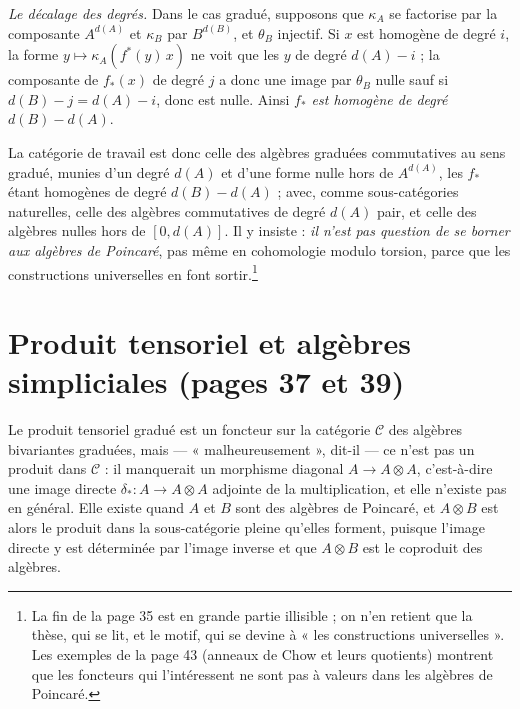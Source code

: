 \documentclass[11pt,a4paper]{article}
\begin{document}
\emph{Le décalage des degrés.} Dans le cas gradué, supposons que $\kappa_{A}$
se factorise par la composante $A^{d(A)}$ et $\kappa_{B}$ par $B^{d(B)}$, et
$\theta_{B}$ injectif. Si $x$ est homogène de degré $i$, la forme
$y \mapsto \kappa_{A}(f^{*}(y)\, x)$ ne voit que les $y$ de degré $d(A) - i$ ;
la composante de $f_{*}(x)$ de degré $j$ a donc une image par $\theta_{B}$
nulle sauf si $d(B) - j = d(A) - i$, donc est nulle. Ainsi
\emph{$f_{*}$ est homogène de degré $d(B) - d(A)$}.

La catégorie de travail est donc celle des algèbres graduées commutatives au
sens gradué, munies d'un degré $d(A)$ et d'une forme nulle hors de
$A^{d(A)}$, les $f_{*}$ étant homogènes de degré $d(B) - d(A)$ ; avec, comme
sous-catégories naturelles, celle des algèbres commutatives de degré $d(A)$
pair, et celle des algèbres nulles hors de $[0, d(A)]$. Il y insiste :
\emph{il n'est pas question de se borner aux algèbres de Poincaré}, pas même en
cohomologie modulo torsion, parce que les constructions universelles en font
sortir.\footnote{La fin de la page 35 est en grande partie illisible ; on n'en
retient que la thèse, qui se lit, et le motif, qui se devine à « les
constructions universelles ». Les exemples de la page 43 (anneaux de Chow et
leurs quotients) montrent que les foncteurs qui l'intéressent ne sont pas à
valeurs dans les algèbres de Poincaré.}

\section*{Produit tensoriel et algèbres simpliciales (pages 37 et 39)}

Le produit tensoriel gradué est un foncteur sur la catégorie $\mathcal{C}$ des
algèbres bivariantes graduées, mais --- « malheureusement », dit-il --- ce
n'est pas un produit dans $\mathcal{C}$ : il manquerait un morphisme diagonal
$A \to A \otimes A$, c'est-à-dire une image directe
$\delta_{*} \colon A \to A \otimes A$ adjointe de la multiplication, et elle
n'existe pas en général. Elle existe quand $A$ et $B$ sont des algèbres de
Poincaré, et $A \otimes B$ est alors le produit dans la sous-catégorie
pleine qu'elles forment, puisque l'image directe y est déterminée par l'image
inverse et que $A \otimes B$ est le coproduit des algèbres.
\end{document}
